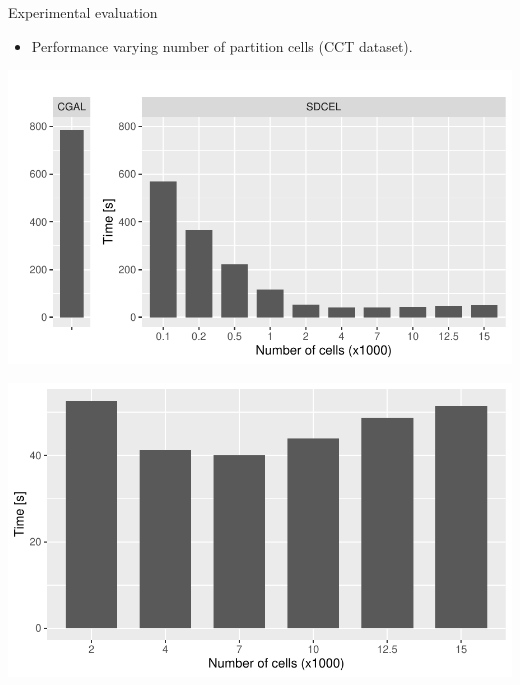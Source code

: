     \begin{frame}{Experimental evaluation}
        \begin{itemize}
            \item Performance varying number of partition cells (CCT dataset).
        \end{itemize}
        \vspace{1cm}

        \begin{minipage}{0.49\textwidth}
            \centering
            \includegraphics[width=\textwidth]{figures/ca}
        \end{minipage}\hfill %
        \begin{minipage}{0.49\textwidth}
            \centering
            \includegraphics[width=\textwidth]{figures/ca_sample}
        \end{minipage}
    \end{frame}

